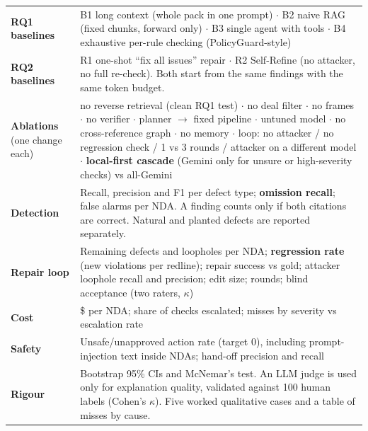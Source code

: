 \documentclass[11pt,a4paper]{article}
\begin{document}
\begin{table}[H]\small
\begin{tabularx}{\textwidth}{@{}>{\raggedright\arraybackslash}p{2.3cm}L@{}}
\toprule
\textbf{RQ1 baselines} & B1 long context (whole pack in one prompt) $\cdot$ B2 naive RAG (fixed chunks, forward only) $\cdot$ B3 single agent with tools $\cdot$ B4 exhaustive per-rule checking (PolicyGuard-style) \\
\textbf{RQ2 baselines} & R1 one-shot ``fix all issues'' repair $\cdot$ R2 Self-Refine (no attacker, no full re-check). Both start from the same findings with the same token budget. \\
\textbf{Ablations} (one change each) & no reverse retrieval (clean RQ1 test) $\cdot$ no deal filter $\cdot$ no frames $\cdot$ no verifier $\cdot$ planner $\rightarrow$ fixed pipeline $\cdot$ untuned model $\cdot$ no cross-reference graph $\cdot$ no memory $\cdot$ loop: no attacker / no regression check / 1 vs 3 rounds / attacker on a different model $\cdot$ \textbf{local-first cascade} (Gemini only for unsure or high-severity checks) vs all-Gemini \\
\textbf{Detection} & Recall, precision and F1 per defect type; \textbf{omission recall}; false alarms per NDA. A finding counts only if both citations are correct. Natural and planted defects are reported separately. \\
\textbf{Repair loop} & Remaining defects and loopholes per NDA; \textbf{regression rate} (new violations per redline); repair success vs gold; attacker loophole recall and precision; edit size; rounds; blind acceptance (two raters, $\kappa$) \\
\textbf{Cost} & \$ per NDA; share of checks escalated; misses by severity vs escalation rate \\
\textbf{Safety} & Unsafe/unapproved action rate (target 0), including prompt-injection text inside NDAs; hand-off precision and recall \\
\textbf{Rigour} & Bootstrap 95\% CIs and McNemar's test. An LLM judge is used only for explanation quality, validated against 100 human labels (Cohen's $\kappa$). Five worked qualitative cases and a table of misses by cause. \\
\bottomrule
\end{tabularx}
\end{table}

\end{document}
